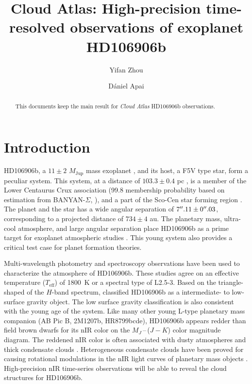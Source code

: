 \documentclass[twocolumn]{aastex62}
\newcommand{\mjup}{\ensuremath{M_\mathrm{Jup}}\xspace}
\newcommand{\teff}{\ensuremath{T_{\mathrm{eff}}}\xspace}
\begin{document}
\title{Cloud Atlas: High-precision time-resolved observations of exoplanet HD106906b}


\author{Yifan Zhou}

\author{D\'aniel Apai}

\begin{abstract}
  This documents keep the main result for \emph{Cloud Atlas} HD106906b \citep{Bailey2013} observations.
\end{abstract}

\keywords{}
\listoftodos

\section{Introduction}

HD106906b, a $11\pm2$ \mjup  mass exoplanet \citep{Bailey2013}, and its host, a F5V type star, form a peculiar system. This system, at a distance of $103.3\pm0.4$ pc \citep{Gaia2016,Gaia2018}, is a member of the Lower Centaurus Crux association (99.8 membership probability based on estimation from BANYAN-$\Sigma$, \citealt{Gagne2018} ), and a part of the Sco-Cen star forming region \citep[average age: $15\pm3$ Myr][]{Pecaut2016}. The planet and the star has a wide angular separation of $7\mbox{$^{\prime\prime}$}.11\pm0\mbox{$^{\prime\prime}$}.03$\citep{Bailey2013}, corresponding to a projected distance of $734\pm4$ au. The planetary mass, ultra-cool atmosphere, and large angular separation place HD106906b as a prime target for exoplanet atmospheric studies \citep{Bailey2013,Kalas2015,Wu2016,Daemgen2017}. This young system also provides a critical test case for planet formation theories.

Multi-wavelength photometry \citep{Bailey2013,Kalas2015,Wu2016} and spectroscopy \citep{Daemgen2017} observations have been used to characterize the atmosphere of HD106906b.  These studies agree on an effective temperature (\teff) of 1800~K or a spectral type of L2.5-3. Based on the triangle-shaped of the $H$-band spectrum, \citet{Bailey2013, Daemgen2017} classified HD106906b as a intermediate- to low-surface gravity object. The low surface gravity classification is also consistent with the young age of the system. Like many other young L-type planetary mass companion (AB Pic B, 2M1207b, HR8799bcde), HD106906b appears redder than field brown dwarfs for its nIR color on the $M_{J}$\,--\,($J-K$) color magnitude diagram. The reddened nIR color is often associated with dusty atmospheres and thick condensate clouds \citep[e.g.,][]{Skemer2011}. Heterogeneous condensate clouds have been proved for causing rotational modulations in the nIR light curves of planetary mass objects \citep[e.g.,][]{Biller2015,Zhou2016,Lew2016,Vos2017,Biller2017,Manjavacas2017,Zhou2019}. High-precision nIR time-series observations will be able to reveal the cloud structures for HD106906b.
\end{document}
